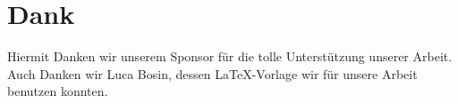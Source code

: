 \chapter*{Dank}

Hiermit Danken wir unserem Sponsor \cite{Altersheim} für die tolle Unterstützung unserer Arbeit. Auch Danken wir Luca Bosin, dessen LaTeX-Vorlage wir für unsere Arbeit benutzen konnten.

